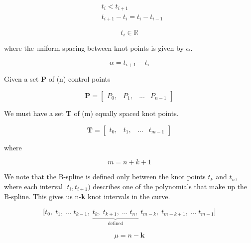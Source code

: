 \documentclass{article}
\begin{document}
\begin{equation}
    \begin{aligned}
        & t_i < t_{i+1} \\
        & t_{i+1} - t_i = t_{i} - t_{i-1}
    \end{aligned}
\end{equation}

\begin{equation}
    t_i \in \mathbb{R} 
\end{equation}

where the uniform spacing between knot points is given by \(\alpha\).

\begin{equation}
    \alpha = t_{i+1} - t_i
\end{equation}


Given a set \textbf{P} of (n) control points

\begin{equation}
    \textbf{P} = \begin{bmatrix} P_0, & P_1, & ... & P_{n-1} \end{bmatrix}
\end{equation}

We must have a set \textbf{T} of (m) equally spaced knot points.

\begin{equation}
    \textbf{T} = \begin{bmatrix} t_0, & t_1 , & ... & t_{m-1} \end{bmatrix}
\end{equation}

where 

\begin{equation}
    m = n + k + 1
\end{equation}

 We note that the B-spline is defined only between the knot points \(t_k\) and \(t_n\), where each interval \([t_i , t_{i+1})\) describes one of the polynomials that make up the B-spline. This gives us n-\textbf{k} knot intervals in the curve.

\begin{equation}
    \Big[ t_0, \; t_1,  \; ... \; t_{k-1} , \; \underbrace{t_k, \; t_{k+1}, \; ... \; t_n,}_{\text{defined}} \; t_{m-k}, \; t_{m-k+1}, \; ... \; t_{m-1} \Big]
\end{equation}

\begin{equation}
    \mu = n-\textbf{k}
\end{equation}
\end{document}
